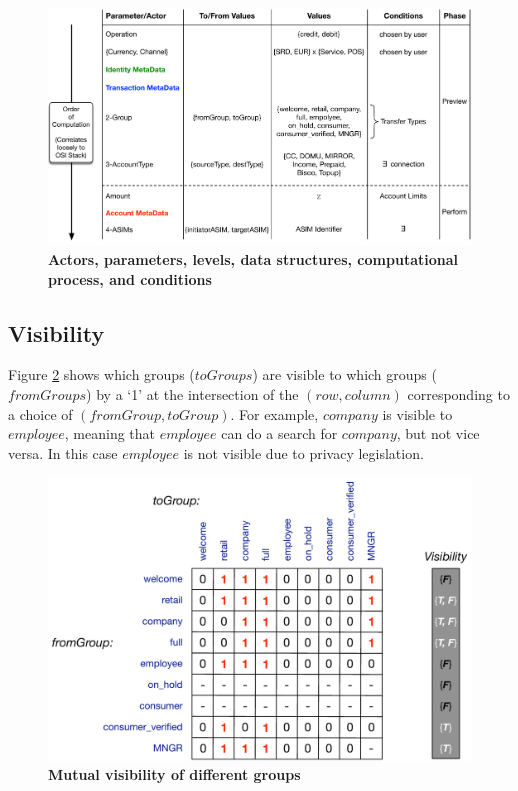 \begin{figure}[htbp]
\centering
\includegraphics[width=17cm]{Figures/Vocabulary}
\caption{\small\textbf{Actors, parameters, levels, data structures, computational process, and conditions}}
\label{fig:vocabulary}
\end{figure}

\subsection{Visibility}
Figure \ref{fig:visibility} shows which groups ($toGroups$) are visible to which groups ($fromGroups$) by a `1' at the intersection of the $(row, column)$ corresponding to a choice of $(fromGroup, toGroup)$. For example, $company$ is visible to $employee$, meaning that $employee$ can do a search for $company$, but not vice versa. In this case $employee$ is not visible due to privacy legislation.

\begin{figure}[H]
\centering
\includegraphics[width=12cm]{Figures/Visibility}
\caption{\small\textbf{Mutual visibility of different groups}}
\label{fig:visibility}
\vspace{-0.5cm}
\end{figure}


